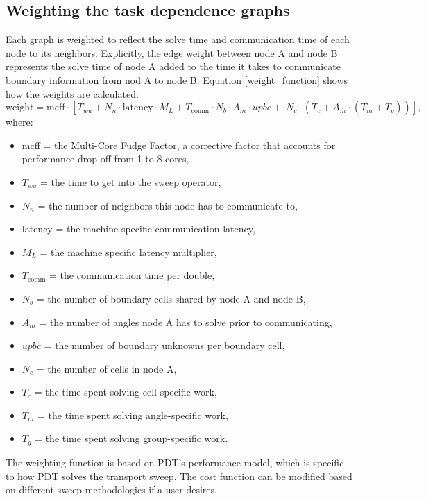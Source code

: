 \subsection{Weighting the task dependence graphs}

Each graph is weighted to reflect the solve time and communication time of each node to its neighbors. Explicitly, the edge weight between node A and node B represents the solve time of node A added to the time it takes to communicate boundary information from nod A to node B. Equation \ref{weight_function} shows how the weights are calculated:
\begin{equation}
\text{weight} = \text{mcff}\cdot [T_{wu} + N_n\cdot \text{latency}\cdot M_L + T_{\text{comm}}\cdot N_b\cdot A_m\cdot upbc + \cdot N_c\cdot (T_c + A_m\cdot (T_m + T_g))],
\label{weight_function}
\end{equation}
where:
\begin{itemize}
  \item mcff = the Multi-Core Fudge Factor, a corrective factor that accounts for performance drop-off from 1 to 8 cores,
  \item $T_{wu}$ = the time to get into the sweep operator,
  \item $N_n$ = the number of neighbors this node has to communicate to,
  \item latency = the machine specific communication latency,
  \item $M_L$ = the machine specific latency multiplier,
  \item $T_{\text{comm}}$ = the communication time per double,
  \item $N_b$ = the number of boundary cells shared by node A and node B,
  \item $A_m$ = the number of angles node A has to solve prior to communicating,
  \item $upbc$ = the number of boundary unknowns per boundary cell,
  \item $N_c$ = the number of cells in node A,
  \item $T_c$ = the time spent solving cell-specific work,
  \item $T_m$ = the time spent solving angle-specific work,
  \item $T_g$ = the time spent solving group-specific work.
\end{itemize}
The weighting function is based on PDT's performance model\cite{mpadams2015}, which is specific to how PDT solves the transport sweep. The cost function can be modified based on different sweep methodologies if a user desires.

